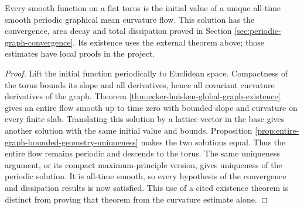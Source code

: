 \begin{corollary}\label{cor:periodic-graph-global-existence-convergence}
Every smooth function on a flat torus is the initial value of a unique all-time smooth periodic graphical mean curvature flow. This solution has the convergence, area decay and total dissipation proved in Section \ref{sec:periodic-graph-convergence}. Its existence uses the external theorem above; those estimates have local proofs in the project.
\end{corollary}
\begin{proof}
Lift the initial function periodically to Euclidean space. Compactness of the torus bounds its slope and all derivatives, hence all covariant curvature derivatives of the graph. Theorem \ref{thm:ecker-huisken-global-graph-existence} gives an entire flow smooth up to time zero with bounded slope and curvature on every finite slab. Translating this solution by a lattice vector in the base gives another solution with the same initial value and bounds. Proposition \ref{prop:entire-graph-bounded-geometry-uniqueness} makes the two solutions equal. Thus the entire flow remains periodic and descends to the torus. The same uniqueness argument, or its compact maximum-principle version, gives uniqueness of the periodic solution. It is all-time smooth, so every hypothesis of the convergence and dissipation results is now satisfied. This use of a cited existence theorem is distinct from proving that theorem from the curvature estimate alone.
\end{proof}
